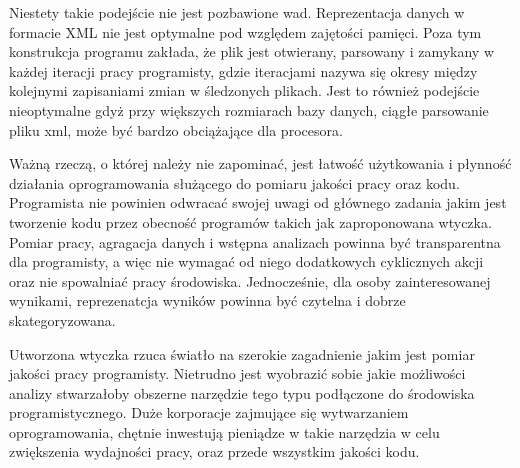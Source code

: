 Niestety takie podejście nie jest pozbawione wad. Reprezentacja danych w formacie XML nie jest
optymalne pod względem zajętości pamięci. Poza tym konstrukcja programu zakłada, że plik jest
otwierany, parsowany i zamykany w każdej iteracji pracy programisty, gdzie iteracjami nazywa się
okresy między kolejnymi zapisaniami zmian w śledzonych plikach. Jest to również podejście 
nieoptymalne gdyż przy większych rozmiarach bazy danych, ciągłe parsowanie pliku xml, może być
bardzo obciążające dla procesora.

Ważną rzeczą, o której należy nie zapominać, jest łatwość użytkowania i płynność działania
oprogramowania służącego do pomiaru jakości pracy oraz kodu. Programista nie powinien odwracać 
swojej uwagi od głównego zadania jakim jest tworzenie kodu przez obecność programów takich jak
zaproponowana wtyczka. Pomiar pracy, agragacja danych i wstępna analizach powinna być 
transparentna dla programisty, a więc nie wymagać od niego dodatkowych cyklicznych akcji oraz
nie spowalniać pracy środowiska. Jednocześnie, dla osoby zainteresowanej wynikami, reprezenatcja
wyników powinna być czytelna i dobrze skategoryzowana.

Utworzona wtyczka rzuca światło na szerokie zagadnienie jakim jest pomiar jakości pracy 
programisty. Nietrudno jest wyobrazić sobie jakie możliwości analizy stwarzałoby obszerne 
narzędzie tego typu podłączone do środowiska programistycznego. Duże korporacje zajmujące się
wytwarzaniem oprogramowania, chętnie inwestują pieniądze w takie narzędzia w celu zwiększenia
wydajności pracy, oraz przede wszystkim jakości kodu.


 
